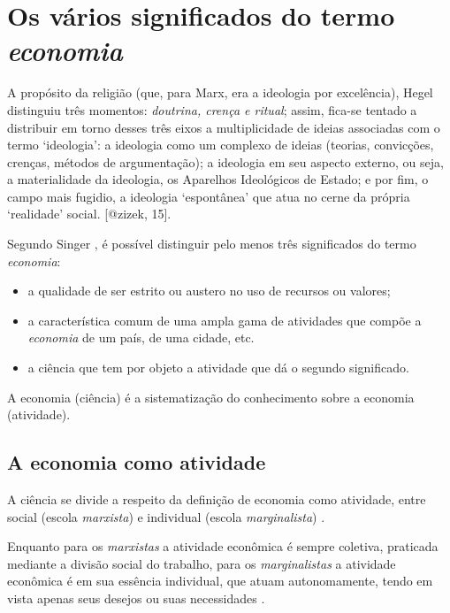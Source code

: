 \documentclass[
	12pt,				%
	oneside,			%
	a4paper,			%
	chapter=TITLE,		%
	section=TITLE,		%
	english,			%
	brazil				%
	]{abntex2}
\begin{document}
\section{\texorpdfstring{Os vários significados do termo
\emph{economia}}{Os vários significados do termo }}\label{os-vuxe1rios-significados-do-termo}
\begin{citacao}
A propósito da religião (que, para Marx, era a ideologia por excelência), Hegel
distinguiu três momentos: \emph{doutrina, crença e ritual}; assim, fica-se
tentado a distribuir em torno desses três eixos a multiplicidade de ideias
associadas com o termo `ideologia': a ideologia como um complexo de ideias
(teorias, convicções, crenças, métodos de argumentação); a ideologia em seu
aspecto externo, ou seja, a materialidade da ideologia, os Aparelhos Ideológicos
de Estado; e por fim, o campo mais fugidio, a ideologia `espontânea' que atua
no cerne da própria `realidade' social.
\cite[p.~15]{zizek} [@zizek, 15].
\end{citacao}
Segundo Singer \autocite*[7]{singer}, é possível distinguir pelo menos
três significados do termo \emph{economia}:
\begin{itemize}
\tightlist
\item
  a qualidade de ser estrito ou austero no uso de recursos ou valores;
\item
  a característica comum de uma ampla gama de atividades que compõe a
  \emph{economia} de um país, de uma cidade, etc.
\item
  a ciência que tem por objeto a atividade que dá o segundo significado.
\end{itemize}
A economia (ciência) é a sistematização do conhecimento sobre a economia
(atividade).

\subsection{A economia como atividade}\label{a-economia-como-atividade}

A ciência se divide a respeito da definição de economia como atividade,
entre social (escola \emph{marxista}) e individual (escola
\emph{marginalista}) \autocite[9]{singer}.

Enquanto para os \emph{marxistas} a atividade econômica é sempre
coletiva, praticada mediante a divisão social do trabalho, para os
\emph{marginalistas} a atividade econômica é em sua essência individual,
que atuam autonomamente, tendo em vista apenas seus desejos ou suas
necessidades \autocite[10]{singer}.
\end{document}
